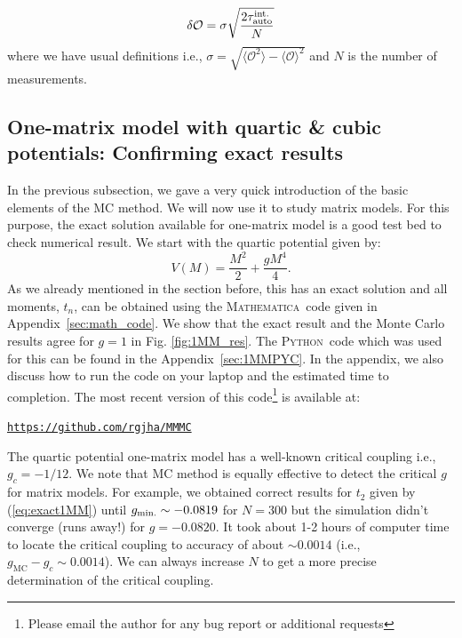 \documentclass[11pt]{article}
\newcommand{\MA}{\textsc{Mathematica}}
\newcommand{\PY}{\textsc{Python}}
\begin{document}
\begin{equation}
	\delta \mathcal{O} = \sigma \sqrt{\frac{2 \tau_{\rm{auto}}^{\rm{int.}}}{N}}  %
\end{equation}
where we have usual definitions i.e., 
$\sigma = \sqrt{\langle \mathcal{O}^2\rangle - \langle \mathcal{O}\rangle^{2}}$ and $N$ is the number of measurements. 

\subsection{One-matrix model with quartic \& cubic potentials: Confirming exact results} 
In the previous subsection, we gave a very quick introduction of the basic elements of the MC method. We will now use it to study matrix models. For this purpose, the exact solution available for one-matrix model is a good test bed to check numerical result. We start with the quartic potential given by:
\begin{equation}
	V(M) = \frac{M^2}{2} + \frac{gM^4}{4}.  
\end{equation}
As we already mentioned in the section before, this has an exact solution and all moments, $t_{n}$, 
can be obtained using the \MA~code given in  Appendix~\ref{sec:math_code}. We show that the exact result and the Monte Carlo results agree for $g=1$ in Fig. \ref{fig:1MM_res}. The \PY~code which was used for this 
can be found in the Appendix~\ref{sec:1MMPYC}. In the appendix, we also 
discuss how to run the code on your laptop and the estimated time to completion. The most recent version of this 
code\footnote{Please email the author for any bug report or additional requests} is available at:
\begin{center} \texttt{\href{https://github.com/rgjha/MMMC}{https://github.com/rgjha/MMMC}} \end{center} 
The quartic potential one-matrix model has a well-known critical coupling i.e., $ g_{c} = -1/12$. 
We note that MC method is equally effective to detect the critical $g$ for matrix models. 
For example, we obtained correct results for $t_{2}$ given by (\ref{eq:exact1MM}) 
until $g_{\rm{min.}} \sim -0.0819$ for $N=300$ but the simulation didn't converge (runs away!) 
for $g = -0.0820$. It took about 1-2 hours of computer time to 
locate the critical coupling to accuracy of about 
$\sim 0.0014$ (i.e., $g_{\text{MC}} - g_{c} \sim 0.0014$). We can always increase $N$ to get a more precise determination of the critical coupling. 
\end{document}

